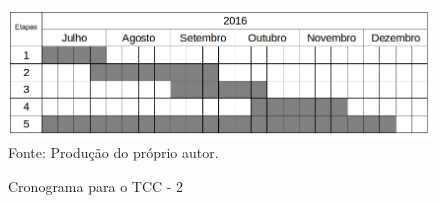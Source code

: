 \begin{figure}[!htb]
	\caption{Cronograma para o TCC - 2}
	\centering
	\includegraphics[scale=0.5]{images/cronograma.png}
	\label{fig:problem_generator}{\\Fonte: Produção do próprio autor.}
\end{figure}

